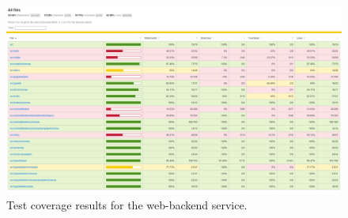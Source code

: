 \begin{landscape}
\begin{figure}
    \centering
    \includegraphics[width=1.3\textwidth]{4_proposed_solution/web_app/figures/test_coverage.png}
    \caption{Test coverage results for the web-backend service.}
    \label{fig:test_coverage}
\end{figure}
\end{landscape}
